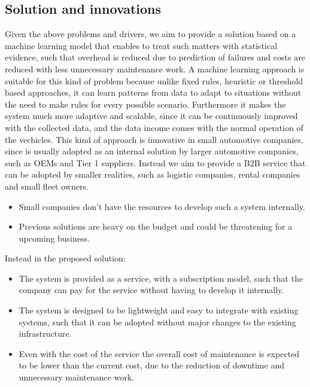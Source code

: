 \documentclass[11pt,a4paper]{article}
\begin{document}
\subsection{Solution and innovations}
\noindent Given the above problems and drivers, we aim to provide a solution based on a machine learning model that enables to treat such matters with statistical evidence, such that overhead is reduced due to prediction of failures and costs are reduced with less unnecessary maintenance work.
\noindent A machine learning approach is suitable for this kind of problem because unlike fixed rules, heuristic or threshold based approaches, it can learn patterns from data to adapt to situations without the need to make rules for every possible scenario.
\noindent Furthermore it makes the system much more adaptive and scalable, since it can be continuously improved with the collected data, and the data income comes with the normal operation of the vechicles.
\newline\newline
\noindent This kind of approach is innovative in small automotive companies, since is usually adopted as an internal solution by
larger automotive companies, such as OEMs and Tier 1 suppliers. Instead we aim to provide a B2B service that can be adopted by 
smaller realities, such as logistic companies, rental companies and small fleet owners.
\begin{itemize}
    \item Small companies don't have the resources to develop such a system internally.
    \item Previous solutions are heavy on the budget and could be threatening for a upcoming business.
\end{itemize}
Instead in the proposed solution:
\begin{itemize}
    \item The system is provided as a service, with a subscription model, such that the company can pay for the service without having to develop it internally.
    \item The system is designed to be lightweight and easy to integrate with existing systems, such that it can be adopted without major changes to the existing infrastructure.
    \item Even with the cost of the service the overall cost of maintenance is expected to be lower than the current cost, due to the reduction of downtime and unnecessary maintenance work.
\end{itemize}
\end{document}
